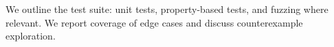We outline the test suite: unit tests, property-based tests, and fuzzing where relevant. We report coverage of edge cases and discuss counterexample exploration.

